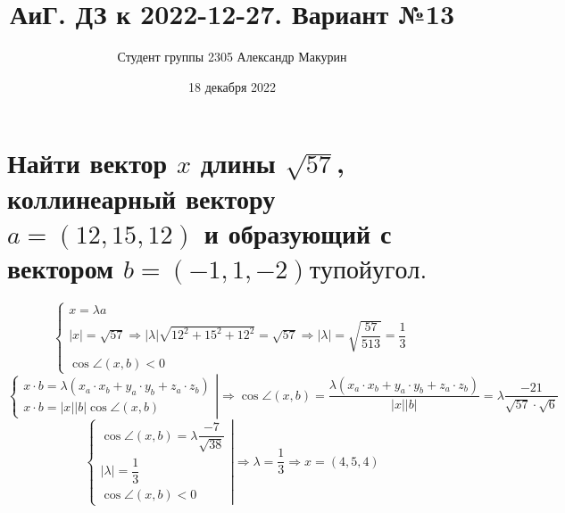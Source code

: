 \documentclass[12pt]{article}
\title{АиГ. ДЗ к 2022-12-27. Вариант №13}
\author{Студент группы 2305 Александр Макурин}
\date{18 декабря 2022}
\begin{document}
\maketitle

\begin{sloppypar}

    \section{Найти вектор $x$ длины $\sqrt{57}$, коллинеарный вектору $a = (12, 15, 12)$ и образующий с вектором $b = (-1, 1, -2) тупой угол.$}
    \[
        \left\{\begin{array}{l}
            x = \lambda a                                                                                                                             \\
            |x| = \sqrt{57} \Rightarrow |\lambda| \sqrt{12^2 + 15^2 + 12^2} = \sqrt{57} \Rightarrow |\lambda| = \sqrt{\dfrac{57}{513}} = \dfrac{1}{3} \\
            \cos \angle (x, b) < 0
        \end{array}\right.
    \]
    \[
        \left\{\begin{array}{l}
            x \cdot b = \lambda (x_a \cdot x_b + y_a \cdot y_b + z_a \cdot z_b) \\
            x \cdot b = |x| |b| \cos {\angle (x, b)}
        \end{array}\right|
        \Rightarrow
        \cos {\angle(x, b)} = \dfrac{\lambda (x_a \cdot x_b + y_a \cdot y_b + z_a \cdot z_b)}{|x| |b|} = \lambda \dfrac{-21}{\sqrt{57} \cdot \sqrt{6}}
    \]
    \[
        \left\{\begin{array}{l}
            \cos {\angle(x, b)} = \lambda \dfrac{-7}{\sqrt{38}} \\
            |\lambda| = \dfrac{1}{3}                            \\
            \cos {\angle (x, b)} < 0
        \end{array}\right|
        \Rightarrow
        \lambda = \dfrac{1}{3}
        \Rightarrow
        x = (4, 5, 4)
    \]



\end{sloppypar}
\end{document}
